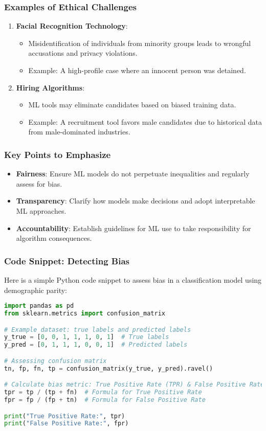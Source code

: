 \documentclass[aspectratio=169]{beamer}
\begin{document}
\begin{frame}
    \frametitle{Examples of Ethical Challenges}
    \begin{enumerate}
        \item \textbf{Facial Recognition Technology}:
            \begin{itemize}
                \item Misidentification of individuals from minority groups leads to wrongful accusations and privacy violations.
                \item Example: A high-profile case where an innocent person was detained.
            \end{itemize}
        \item \textbf{Hiring Algorithms}:
            \begin{itemize}
                \item ML tools may eliminate candidates based on biased training data.
                \item Example: A recruitment tool favors male candidates due to historical data from male-dominated industries.
            \end{itemize}
    \end{enumerate}
\end{frame}

\begin{frame}
    \frametitle{Key Points to Emphasize}
    \begin{itemize}
        \item \textbf{Fairness}: Ensure ML models do not perpetuate inequalities and regularly assess for bias.
        \item \textbf{Transparency}: Clarify how models make decisions and adopt interpretable ML approaches.
        \item \textbf{Accountability}: Establish guidelines for ML use to take responsibility for algorithm consequences.
    \end{itemize}
\end{frame}

\begin{frame}[fragile]
    \frametitle{Code Snippet: Detecting Bias}
    Here is a simple Python code snippet to assess bias in a classification model using demographic parity:
    \begin{lstlisting}[language=Python]
import pandas as pd
from sklearn.metrics import confusion_matrix

# Example dataset: true labels and predicted labels
y_true = [0, 0, 1, 1, 1, 0, 1]  # True labels
y_pred = [0, 1, 1, 1, 0, 0, 1]  # Predicted labels

# Assessing confusion matrix
tn, fp, fn, tp = confusion_matrix(y_true, y_pred).ravel()

# Calculate bias metric: True Positive Rate (TPR) & False Positive Rate (FPR)
tpr = tp / (tp + fn)  # Formula for True Positive Rate
fpr = fp / (fp + tn)  # Formula for False Positive Rate

print("True Positive Rate:", tpr)
print("False Positive Rate:", fpr)
    \end{lstlisting}
\end{frame}
\end{document}
